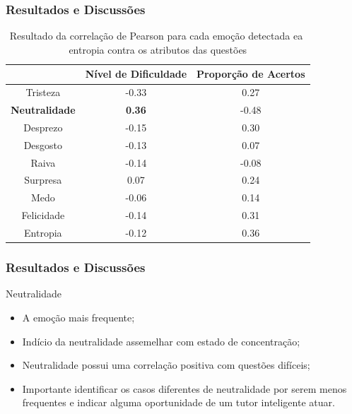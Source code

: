\documentclass{beamer}
\begin{document}
\begin{frame}
\frametitle{Resultados e Discuss\~oes}
\begin{table}[]\footnotesize
\centering
\caption{Resultado​ ​da​ ​correla\c{c}\~ao​ ​de​ ​Pearson​ ​para​ ​cada​ ​emo\c{c}\~ao​ ​detectada
e​ ​a​ ​entropia​ ​contra​ ​os​ ​atributos​ ​das​ ​quest\~oes}
\label{my-label}
\begin{tabular}{|c|c|c|}
\hline
                      & \textbf{Nível de Dificuldade} & \textbf{Proporção de Acertos} \\ \hline
Tristeza	     & -0.33                & 0.27                          \\ \hline
\small \textbf{Neutralidade} & \small \textbf{0.36}                 & -0.48                \\ \hline
Desprezo     		& -0.15                         & 0.30                 \\ \hline
Desgosto              & -0.13                         & 0.07                          \\ \hline
Raiva                 & -0.14                         & -0.08                         \\ \hline
Surpresa              & 0.07                          & 0.24                          \\ \hline
Medo                  & -0.06                         & 0.14                          \\ \hline
Felicidade   		& -0.14                         & 0.31                 \\ \hline
Entropia     		& -0.12                         & 0.36                 \\ \hline
\end{tabular}
\end{table}
\end{frame}



\begin{frame}
\frametitle{Resultados e Discuss\~oes}
\begin{block}{Neutralidade}
\begin{itemize}
\item A emo\c{c}\~ao mais frequente;
\item Ind\'{i}cio da neutralidade assemelhar com estado de concentra\c{c}\~ao;
\item Neutralidade possui uma correla\c{c}\~ao positiva com quest\~oes dif\'{i}ceis;
\pause
\item Importante identificar os casos diferentes de neutralidade por serem menos frequentes 
e indicar alguma oportunidade de um tutor inteligente atuar.
\end{itemize}
\end{block}

\end{frame}
\end{document}
